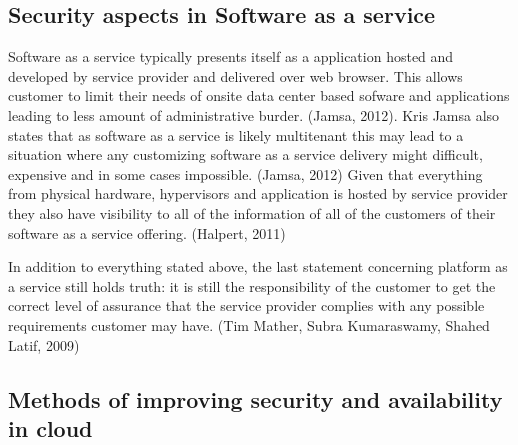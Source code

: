 \documentclass{article}
\begin{document}
\subsection{Security aspects in Software as a service}
Software as a service typically presents itself as a application hosted and developed by service provider and delivered over web browser. This allows customer to limit their needs of onsite data center based sofware and applications leading to less amount of administrative burder. (Jamsa, 2012). Kris Jamsa also states that as software as a service is likely multitenant this may lead to a situation where any customizing software as a service delivery might difficult, expensive and in some cases impossible. (Jamsa, 2012)
Given that everything from physical hardware, hypervisors and application is hosted by service provider they also have visibility to all of the information of all of the customers of their software as a service offering. (Halpert, 2011)
\par
In addition to everything stated above, the last statement concerning platform as a service still holds truth: it is still the responsibility of the customer to get the correct level of assurance that the service provider complies with any possible requirements customer may have. (Tim Mather, Subra Kumaraswamy, Shahed Latif, 2009)
\subsection{Methods of improving security and availability in cloud}
\end{document}

